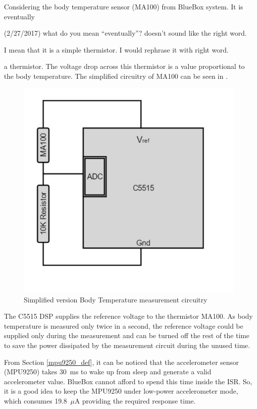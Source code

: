 Considering the body temperature sensor (MA100) from BlueBox system.
It is eventually
\begin{cmtPai}
	(2/27/2017) what do you mean ``eventually''?  doesn't sound like
	the right word.
\end{cmtPai}
\begin{cmtSMS}
	I mean that it is a simple thermistor. I would rephrase it with right word.
\end{cmtSMS}
a thermistor. The voltage drop across this thermistor is a value
proportional to the body temperature. The simplified circuitry of
MA100 can be seen in .

 \begin{figure}
 	\centering
 	\includegraphics[scale = 0.5 ]{body_temp}
\caption{Simplified version Body Temperature measurement circuitry}
\label{body_temp}
 \end{figure}

The C5515 DSP supplies the reference voltage to the thermistor MA100.
As body temperature is measured only twice in a second, the reference
voltage could be supplied only during the measurement and can be
turned off the rest of the time to save the power dissipated by the
measurement circuit during the unused time.
 
From Section \ref{mpu9250_def}, it can be noticed that the
accelerometer sensor (MPU9250) takes 30~ms to wake up from sleep and
generate a valid accelerometer value. BlueBox cannot afford to spend
this time inside the ISR. So, it is a good idea to keep the MPU9250
under low-power accelerometer mode, which consumes 19.8~$\mu$A
providing the required response time.
 
